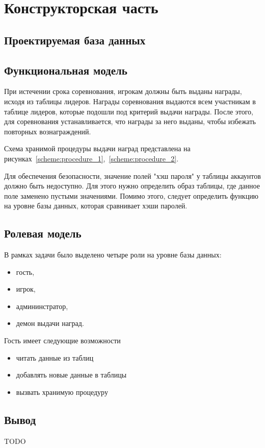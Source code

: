 \chapter{Конструкторская часть}


\section{Проектируемая база данных}



\section{Функциональная модель}
При истечении срока соревнования, игрокам должны быть выданы награды, исходя из таблицы лидеров. Награды соревнования выдаются всем участникам в таблице лидеров, которые подошли под критерий выдачи награды. После этого, для соревнования устанавливается, что награды за него выданы, чтобы избежать повторных вознаграждений.

Схема хранимой процедуры выдачи наград представлена на рисунках~\ref{scheme:procedure_1},~\ref{scheme:procedure_2}.

Для обеспечения безопасности, значение полей "хэш пароля" у таблицы аккаунтов должно быть недоступно. Для этого нужно определить образ таблицы, где данное поле заменено пустыми значениями. Помимо этого, следует определить функцию на уровне базы данных, которая сравнивает хэши паролей.


\section{Ролевая модель}


В рамках задачи было выделено четыре роли на уровне базы данных:
\begin{itemize}
	\item гость,
	\item игрок,
	\item админинстратор,
	\item демон выдачи наград.
\end{itemize}
Гость имеет следующие возможности
\begin{itemize}
	\item читать данные из таблиц
	\item добавлять новые данные в таблицы
	\item вызвать хранимую процедуру
\end{itemize}

\section*{Вывод}

TODO
\clearpage
